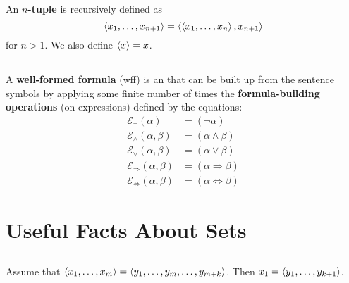 \documentclass{report}
\begin{document}
An \textbf{$n$-tuple} is recursively defined as
  $$\left< x_1, \ldots, x_{n+1} \right> = \left< \left< x_1, \ldots, x_n \right>, x_{n+1} \right>$$
  for $n > 1$.
We also define $\left< x \right> = x$.

\section{}%

  A \textbf{well-formed formula} (wff) is an  that can
    be built up from the sentence symbols by applying some finite number of
    times the \textbf{formula-building operations} (on expressions) defined by
    the equations:
    \begin{align*}
      \mathcal{E}_{\neg}(\alpha)
        & = (\neg \alpha) \\
      \mathcal{E}_{\land}(\alpha, \beta)
        & = (\alpha \land \beta) \\
      \mathcal{E}_{\lor}(\alpha, \beta)
        & = (\alpha \lor \beta) \\
      \mathcal{E}_{\Rightarrow}(\alpha, \beta)
        & = (\alpha \Rightarrow \beta) \\
      \mathcal{E}_{\Leftrightarrow}(\alpha, \beta)
        & = (\alpha \Leftrightarrow \beta)
    \end{align*}

\endgroup

\setcounter{chapter}{0}
\addtocounter{chapter}{-1}
\chapter{Useful Facts About Sets}%

\section{}%

  \begin{lemma}[0A]
    Assume that $\left< x_1, \ldots, x_m \right> = \left< y_1, \ldots, y_m, \ldots, y_{m+k} \right>$.
    Then $x_1 = \left< y_1, \ldots, y_{k+1} \right>$.
  \end{lemma}
\end{document}
